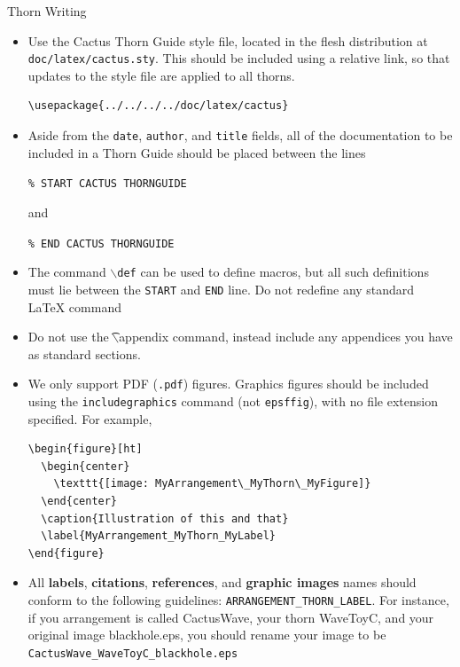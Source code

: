 \begin{cactuspart}{Thorn Writing}
\begin{itemize}

  \item Use the Cactus Thorn Guide style file, located in the flesh
    distribution at \texttt{doc/latex/cactus.sty}. This should be
    included using a relative link, so that updates to the style file
    are applied to all thorns.
%
\begin{verbatim}
\usepackage{../../../../doc/latex/cactus}
\end{verbatim}

  \item Aside from the \texttt{date}, \texttt{author}, and \texttt{title} fields,
    all of the documentation to be included in a Thorn Guide should be
    placed between the lines


 \texttt{\% START CACTUS THORNGUIDE}

and

 \texttt{\% END CACTUS THORNGUIDE}

 \item The command \texttt{$\backslash$def} can be used to define macros, but all
   such definitions must lie between the \texttt{START} and \texttt{END}
   line. Do not redefine any standard LaTeX command

 \item Do not use the {\t $\backslash$appendix} command, instead include any appendices
        you have as standard sections.

 \item We only support PDF (\texttt{.pdf}) figures.
   Graphics figures should be included using the \texttt{includegraphics}
   command (not \texttt{epsffig}), with no file extension specified. For example,
%
\begin{verbatim}
\begin{figure}[ht]
  \begin{center}
    \texttt{[image: MyArrangement\_MyThorn\_MyFigure]}
  \end{center}
  \caption{Illustration of this and that}
  \label{MyArrangement_MyThorn_MyLabel}
\end{figure}
\end{verbatim}

 \item All {\bf labels}, {\bf citations}, {\bf references}, and {\bf
   graphic images} names should conform to the following guidelines:
   \texttt{ARRANGEMENT\_THORN\_LABEL}.  For instance, if you arrangement is
   called CactusWave, your thorn WaveToyC, and your original image
   blackhole.eps, you should rename your image to be {\tt
     CactusWave\_WaveToyC\_blackhole.eps}


\end{itemize}
\end{cactuspart}
